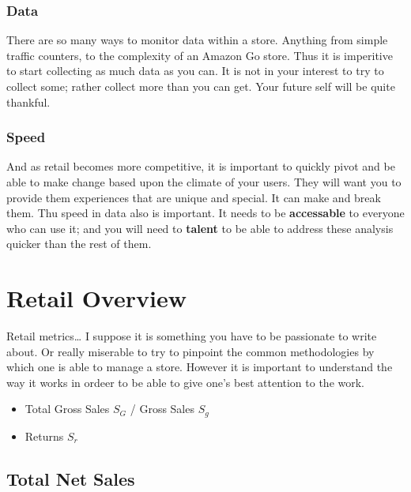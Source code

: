 \documentclass[]{book}
\providecommand{\tightlist}{%
  \setlength{\itemsep}{0pt}\setlength{\parskip}{0pt}}
\theoremstyle{definition}
\theoremstyle{definition}
\theoremstyle{definition}
\theoremstyle{remark}
\begin{document}
\hypertarget{data}{%
\subsection{Data}\label{data}}

There are so many ways to monitor data within a store. Anything from
simple traffic counters, to the complexity of an Amazon Go store. Thus
it is imperitive to start collecting as much data as you can. It is not
in your interest to try to collect some; rather collect more than you
can get. Your future self will be quite thankful.

\hypertarget{speed}{%
\subsection{Speed}\label{speed}}

And as retail becomes more competitive, it is important to quickly pivot
and be able to make change based upon the climate of your users. They
will want you to provide them experiences that are unique and special.
It can make and break them. Thu speed in data also is important. It
needs to be \textbf{accessable} to everyone who can use it; and you will
need to \textbf{talent} to be able to address these analysis quicker
than the rest of them.

\hypertarget{retail-overview}{%
\chapter{Retail Overview}\label{retail-overview}}

Retail metrics\ldots{} I suppose it is something you have to be
passionate to write about. Or really miserable to try to pinpoint the
common methodologies by which one is able to manage a store. However it
is important to understand the way it works in ordeer to be able to give
one's best attention to the work.

\begin{itemize}
\tightlist
\item
  Total Gross Sales \(S_G\) / Gross Sales \(S_g\)
\item
  Returns \(S_r\)
\end{itemize}

\hypertarget{total-net-sales}{%
\section{Total Net Sales}\label{total-net-sales}}
\end{document}

